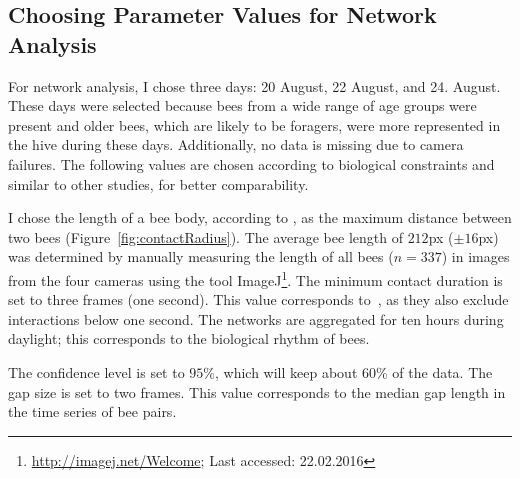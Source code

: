 \subsection{Choosing Parameter Values for Network Analysis}
For network analysis, I chose three days: 20 August, 22 August, and 24. August.
These days were selected because bees from a wide range of age groups were present and older bees, which are likely to be foragers, were more represented in the hive during these days.
Additionally, no data is missing due to camera failures.
The following values are chosen according to biological constraints and similar to other studies, for better comparability.

I chose the length of a bee body, according to \textcite{baracchi2014socio}, as the maximum distance between two bees (Figure~\ref{fig:contactRadius}).
The average bee length of $212$px ($\pm 16$px)  was determined by manually measuring the length of all bees ($n=337$) in images from the four cameras using the tool ImageJ\footnote{\url{http://imagej.net/Welcome}; Last accessed:
 22.02.2016}.
The minimum contact duration is set to three frames (one second). This value corresponds to~\textcite{mersch2013tracking}, as they also exclude interactions below one second.
The networks are aggregated for ten hours during daylight; this corresponds to the biological rhythm of bees.

The confidence level is set to $95\%$, which will keep about 60\% of the data.
The gap size is set to two frames. This value corresponds to the median gap length in the time series of bee pairs.



